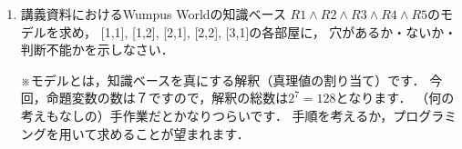 \documentclass[dvipdfmx]{jsarticle}
\begin{document}
\begin{enumerate}
\item
  講義資料におけるWumpus Worldの知識ベース
  $R1 \land R2 \land R3 \land R4 \land R5$のモデルを求め，
  [1,1], [1,2], [2,1], [2,2], [3,1]の各部屋に，
  穴があるか・ないか・判断不能かを示しなさい．

  ※モデルとは，知識ベースを真にする解釈（真理値の割り当て）です．
  今回，命題変数の数は７ですので，解釈の総数は$2^7=128$となります．
  （何の考えもなしの）手作業だとかなりつらいです．
  手順を考えるか，プログラミングを用いて求めることが望まれます．


\end{enumerate}
\end{document}
